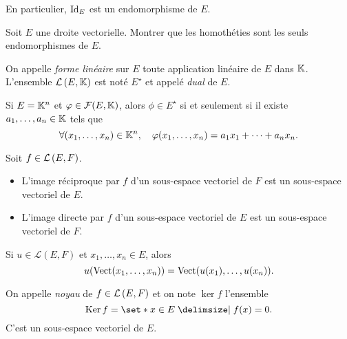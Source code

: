 \documentclass{magnolia}
\begin{document}
\begin{remarqueUnique}
\remarque En particulier, $\operatorname{Id}_E$ est un endomorphisme de $E$.
\end{remarqueUnique}

\begin{exoUnique}
\exo Soit $E$ une droite vectorielle. Montrer que les homothéties sont les seuls
  endomorphismes de $E$.
\end{exoUnique}

\begin{definition}[utile=1]
On appelle \emph{forme linéaire} sur $E$ toute application linéaire de $E$ dans $\mathbb{K}$.
L'ensemble $\mathcal{L}\left(E,\mathbb{K}\right)$ est noté $E^\star$ et appelé \emph{dual} de $E$.
\end{definition}

\begin{remarqueUnique}
\remarque Si $E=\mathbb{K}^n$ et $\varphi\in\mathcal{F}(E,\mathbb{K})$, alors $\phi\in E^\star$
  si et seulement si il existe $a_1,\ldots,a_n\in\mathbb{K}$ tels que
  \[\forall (x_1,\ldots,x_n)\in\mathbb{K}^n,\quad \varphi(x_1,\ldots,x_n)=a_1x_1+\cdots+a_nx_n.\]
\end{remarqueUnique}

\begin{proposition}[utile=-3]
Soit $f\in\mathcal{L}\left(E,F\right)$.
\begin{itemize}
\item L'image réciproque par $f$ d'un sous-espace vectoriel de $F$ est un
  sous-espace vectoriel de $E$.
\item L'image directe par $f$ d'un sous-espace vectoriel de $E$ est un
  sous-espace vectoriel de $F$.
\end{itemize}
\end{proposition}

\begin{remarqueUnique}
\remarque Si $u\in\mathcal{L}(E, F)$ et $x_1,\ldots,x_n\in E$, alors
  \[u(\operatorname{Vect}(x_1,\ldots,x_n))=\operatorname{Vect}(u(x_1),\ldots,u(x_n)).\]
\end{remarqueUnique}

\begin{definition}[utile=-3]
On appelle \emph{noyau} de $f\in\mathcal{L}\left(E,F\right)$ et on note $\ker f$ l'ensemble
\[\ker f=\enstq{x\in E}{f(x)=0}.\]  
C'est un sous-espace vectoriel de $E$.
\end{definition}

\end{document}

